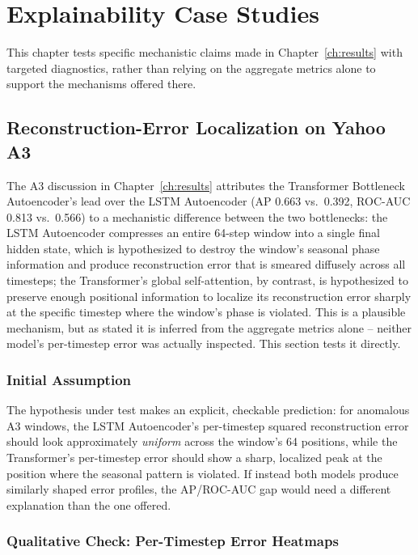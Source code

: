 \chapter{Explainability Case Studies}
\label{ch:explainability}

This chapter tests specific mechanistic claims made in Chapter~\ref{ch:results} with targeted diagnostics, rather than relying on the aggregate metrics alone to support the mechanisms offered there.

\section{Reconstruction-Error Localization on Yahoo A3}
\label{sec:explain-yahoo}

The A3 discussion in Chapter~\ref{ch:results} attributes the Transformer Bottleneck Autoencoder's lead over the LSTM Autoencoder (AP 0.663 vs.\ 0.392, ROC-AUC 0.813 vs.\ 0.566) to a mechanistic difference between the two bottlenecks: the LSTM Autoencoder compresses an entire 64-step window into a single final hidden state, which is hypothesized to destroy the window's seasonal phase information and produce reconstruction error that is smeared diffusely across all timesteps; the Transformer's global self-attention, by contrast, is hypothesized to preserve enough positional information to localize its reconstruction error sharply at the specific timestep where the window's phase is violated. This is a plausible mechanism, but as stated it is inferred from the aggregate metrics alone -- neither model's per-timestep error was actually inspected. This section tests it directly.

\subsection{Initial Assumption}

The hypothesis under test makes an explicit, checkable prediction: for anomalous A3 windows, the LSTM Autoencoder's per-timestep squared reconstruction error should look approximately \emph{uniform} across the window's 64 positions, while the Transformer's per-timestep error should show a sharp, localized peak at the position where the seasonal pattern is violated. If instead both models produce similarly shaped error profiles, the AP/ROC-AUC gap would need a different explanation than the one offered.

\subsection{Qualitative Check: Per-Timestep Error Heatmaps}

